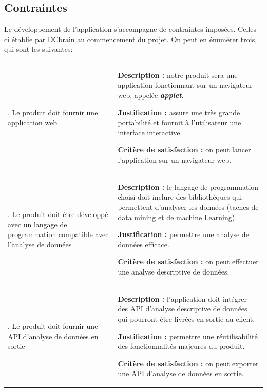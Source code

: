 		\subsection{Contraintes}
		Le développement de l'application s'accompagne de contraintes imposées. Celles-ci établie par DCbrain au commencement du projet. On peut en énumérer trois, qui sont les suivantes:\\
		\begin{center}\begin{longtable}{|>{\centering}m{4cm}|>{\raggedright\arraybackslash}m{11cm}|}			
				\hline \multicolumn{1}{|c}{\textbf{Contrainte}} & \multicolumn{1}{|c|}{\textbf{Fiche}} \\
				\hline 	1. Le produit doit fournir une application web &
						\begin{description}[style=unboxed,leftmargin=0.2cm]
						\item{\textbf{Description :}} notre produit sera une application fonctionnant sur un navigateur web, appelée \textbf{\textit{applet}}.
						\item{\textbf{Justification :}} assure une très grande portabilité et fournit à l'utilisateur une interface interactive.
						\item{\textbf{Critère de satisfaction :}} on peut lancer l'application sur un navigateur web.
						\end{description}\\
				\hline 2. Le produit doit être développé avec un langage de programmation compatible avec l'analyse de données &
						\begin{description}[style=unboxed,leftmargin=0.2cm]
						\item{\textbf{Description :}} le langage de programmation choisi doit inclure des bibliothèques qui permettent d'analyser les données (taches de data mining et de machine Learning).
						\item{\textbf{Justification :}} permettre une analyse de données efficace.
						\item{\textbf{Critère de satisfaction :}} on peut effectuer une analyse descriptive de données.
						\end{description}\\
				\hline 3. Le produit doit fournir une API d'analyse de données en sortie &
						\begin{description}[style=unboxed,leftmargin=0.2cm]
						\item{\textbf{Description :}} l'application doit intégrer des API d'analyse descriptive de données qui pourront être livrées en sortie au client.
						\item{\textbf{Justification :}} permettre une réutilisabilité des fonctionnalités majeures du produit.
						\item{\textbf{Critère de satisfaction :}} on peut exporter une API d'analyse de données en sortie.
						\end{description}\\
				\hline
				\end{longtable}\vspace{1em}\end{center}
			

